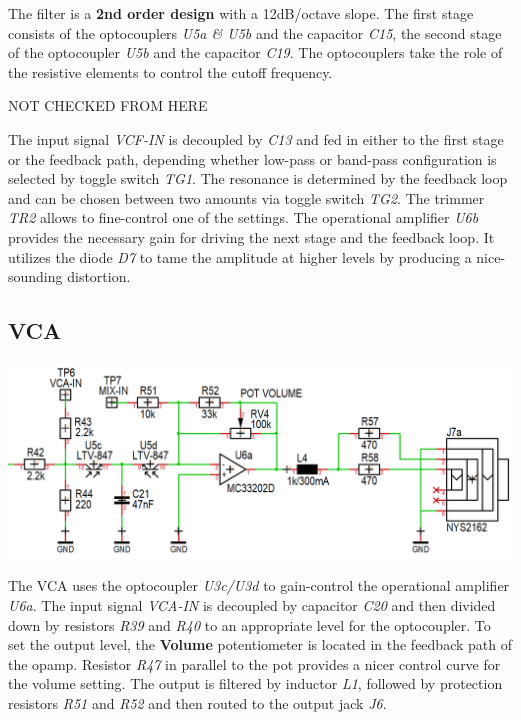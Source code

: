 \documentclass{scrartcl}
\begin{document}
The filter is a \textbf{2nd order design} with a 12dB/octave slope. The first stage consists of the optocouplers \emph{U5a \& U5b} and the capacitor \emph{C15}, the second stage of the optocoupler \emph{U5b} and the capacitor \emph{C19}. The optocouplers take the role of the resistive elements to control the cutoff frequency.

NOT CHECKED FROM HERE

The input signal \emph{VCF-IN} is decoupled by \emph{C13} and fed in either to the first stage or the feedback path, depending whether low-pass or band-pass configuration is selected by toggle switch \emph{TG1}. The resonance is determined by the feedback loop and can be chosen between two amounts via toggle switch \emph{TG2}. The trimmer \emph{TR2} allows to fine-control one of the settings. The operational amplifier \emph{U6b} provides the necessary gain for driving the next stage and the feedback loop. It utilizes the diode \emph{D7} to tame the amplitude at higher levels by producing a nice-sounding distortion.

\subsection{VCA}

\begin{center}
    \includegraphics[scale=0.40]{assets/schema-vca.png}
\end{center}

The VCA uses the optocoupler \emph{U3c/U3d} to gain-control the operational amplifier \emph{U6a}. The input signal \emph{VCA-IN} is decoupled by capacitor \emph{C20} and then divided down by resistors \emph{R39} and \emph{R40} to an appropriate level for the optocoupler. To set the output level, the \textbf{Volume} potentiometer is located in the feedback path of the opamp. Resistor \emph{R47} in parallel to the pot provides a nicer control curve for the volume setting. The output is filtered by inductor \emph{L1}, followed by protection resistors \emph{R51} and \emph{R52} and then routed to the output jack \emph{J6}.
\end{document}
